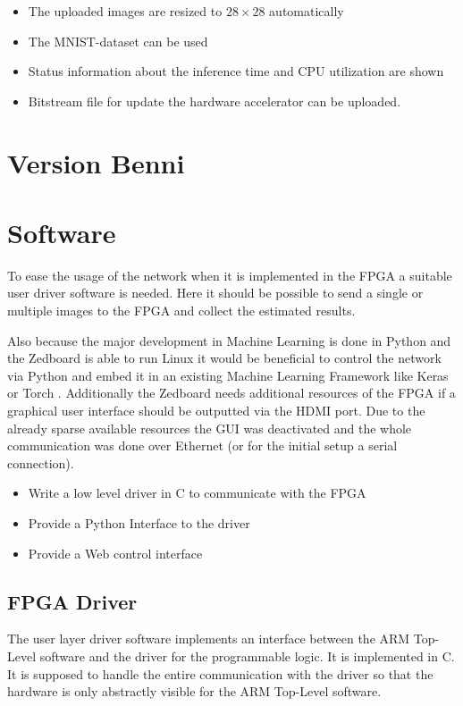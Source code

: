 \begin{itemize}
	\item The uploaded images are resized to $28 \times 28$ automatically
	\item The MNIST-dataset can be used
	\item Status information about the inference time and CPU utilization are shown
	\item Bitstream file for update the hardware accelerator can be uploaded. 
\end{itemize}

\section{Version Benni}
\section{Software}

To ease the usage of the network when it is implemented in the FPGA a suitable user driver software is needed. Here it should be possible to send a single or multiple images to the FPGA and collect the estimated results. 

Also because the major development in Machine Learning is done in Python and the Zedboard is able to run Linux it would be beneficial to control the network via Python and embed it in an existing Machine Learning Framework like Keras \cite{Gulli:2017aa} or Torch \cite{Paszke:2019aa}. Additionally the Zedboard needs additional resources of the FPGA if a graphical user interface should be outputted via the HDMI port. Due to the already sparse available resources the GUI was deactivated and the whole communication was done over Ethernet (or for the initial setup a serial connection). 

\begin{itemize}
	\item Write a low level driver in C to communicate with the FPGA
	\item Provide a Python Interface to the driver
	\item Provide a Web control interface
\end{itemize}


\subsection{FPGA Driver}

The user layer driver software implements an interface between the ARM Top-Level software and the driver for the programmable logic. It is implemented in C. It is supposed to handle the entire communication with the driver so that the hardware is only abstractly visible for the ARM Top-Level software.

